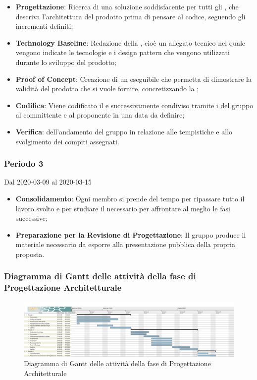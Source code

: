 \begin{itemize}
	\item \textbf{Progettazione}: Ricerca di una soluzione soddisfacente per tutti gli , che descriva l'architettura del prodotto prima di pensare al codice, seguendo gli incrementi definiti;
	\item \textbf{Technology Baseline}: Redazione della , cioè un allegato tecnico nel quale vengono indicate le tecnologie e i design pattern che vengono utilizzati durante lo sviluppo del prodotto;
	\item \textbf{Proof of Concept}: Creazione di un eseguibile che permetta di dimostrare la validità del prodotto che si vuole fornire, concretizzando la ;
	\item \textbf{Codifica}: Viene codificato il  e successivamente condiviso tramite i  del gruppo al committente e al proponente in una data da definire;
	\item \textbf{Verifica}:  dell'andamento del gruppo in relazione alle tempistiche e allo svolgimento dei compiti assegnati.
\end{itemize}

\subsubsection{Periodo 3} 
Dal 2020-03-09 al 2020-03-15
\begin{itemize}
	\item \textbf{Consolidamento}: Ogni membro si prende del tempo per ripassare tutto il lavoro svolto e per studiare il necessario per affrontare al meglio le fasi successive;
	\item \textbf{Preparazione per la Revisione di Progettazione}: Il gruppo produce il materiale necessario da esporre alla presentazione pubblica della propria proposta.
\end{itemize}


\newpage
\begin{landscape}
\subsubsection{Diagramma di Gantt delle attività della fase di Progettazione Architetturale}
\pagestyle{empty}
\begin{figure}[h]
	\centering
	\includegraphics[scale=0.34]{Sezioni/DiagrammiGantt/ProgettazioneArchitetturale.png}
	\caption{Diagramma di Gantt delle attività della fase di Progettazione Architetturale}	
\end{figure}
\end{landscape}
\clearpage